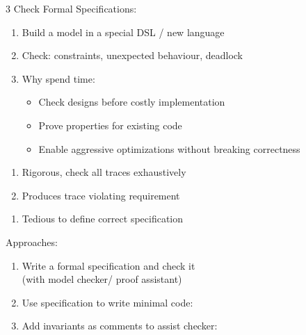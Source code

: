 \documentclass[12pt, a4paper]{article}
\begin{document}
\begin{multicols*}{3}
Check Formal Specifications:
\begin{enumerate}[\roman*.]
  \item Build a model in a special DSL / new language
  \item Check: constraints, unexpected behaviour, deadlock
  \item Why spend time:
  \begin{itemize}[leftmargin=*]\vspace{3pt}
    \item Check designs before costly implementation
    \item Prove properties for existing code
    \item Enable aggressive optimizations without breaking correctness
  \end{itemize}
\end{enumerate}
\begin{enumerate}[$+$]\vspace{-1pt}
  \item Rigorous, check all traces exhaustively 
  \item Produces trace violating requirement
\end{enumerate}
\begin{enumerate}[$-$]\vspace{-1pt}
  \item Tedious to define correct specification
\end{enumerate}

Approaches:
\begin{enumerate}[\roman*.]
  \item Write a formal specification and check it\\(with model checker/ proof assistant)
  \item Use specification to write minimal code:
  \item Add invariants as comments to assist checker:
\end{enumerate}


\end{multicols*}
\end{document}
